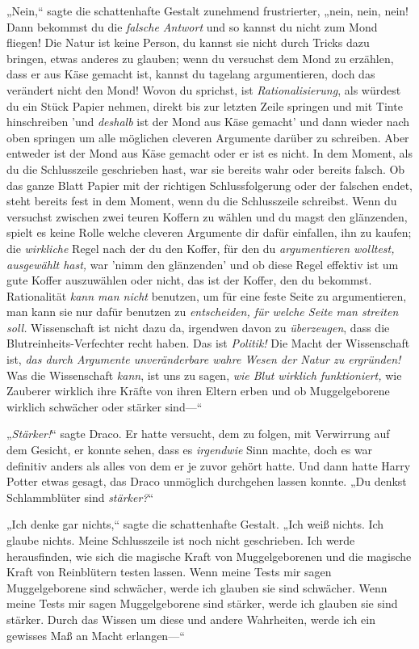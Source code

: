 {„Nein,“ sagte die schattenhafte Gestalt zunehmend frustrierter, „nein, nein, nein! Dann bekommst du die \emph{falsche Antwort} und so kannst du nicht zum Mond fliegen! Die Natur ist keine Person, du kannst sie nicht durch Tricks dazu bringen, etwas anderes zu glauben; wenn du versuchst dem Mond zu erzählen, dass er aus Käse gemacht ist, kannst du tagelang argumentieren, doch das verändert nicht den Mond! Wovon du sprichst, ist \emph{Rationalisierung}, als würdest du ein Stück Papier nehmen, direkt bis zur letzten Zeile springen und mit Tinte hinschreiben 'und \emph{deshalb} ist der Mond aus Käse gemacht' und dann wieder nach oben springen um alle möglichen cleveren Argumente darüber zu schreiben. Aber entweder ist der Mond aus Käse gemacht oder er ist es nicht. In dem Moment, als du die Schlusszeile geschrieben hast, war sie bereits wahr oder bereits falsch. Ob das ganze Blatt Papier mit der richtigen Schlussfolgerung oder der falschen endet, steht bereits fest in dem Moment, wenn du die Schlusszeile schreibst. Wenn du versuchst zwischen zwei teuren Koffern zu wählen und du magst den glänzenden, spielt es keine Rolle welche cleveren Argumente dir dafür einfallen, ihn zu kaufen; die \emph{wirkliche} Regel nach der du den Koffer, für den du \emph{argumentieren wolltest, ausgewählt hast,} war 'nimm den glänzenden' und ob diese Regel effektiv ist um gute Koffer auszuwählen oder nicht, das ist der Koffer, den du bekommst. Rationalität \emph{kann man nicht} benutzen, um für eine feste Seite zu argumentieren, man kann sie nur dafür benutzen zu \emph{entscheiden, für welche Seite man streiten soll.} Wissenschaft ist nicht dazu da, irgendwen davon zu \emph{überzeugen}, dass die Blutreinheits-Verfechter recht haben. Das ist \emph{Politik!} Die Macht der Wissenschaft ist, \emph{das durch Argumente unveränderbare wahre Wesen der Natur zu ergründen!} Was die Wissenschaft \emph{kann}, ist uns zu sagen, \emph{wie Blut wirklich funktioniert,} wie Zauberer wirklich ihre Kräfte von ihren Eltern erben und ob Muggelgeborene wirklich schwächer oder stärker sind—“

„\emph{Stärker!}“ sagte Draco. Er hatte versucht, dem zu folgen, mit Verwirrung auf dem Gesicht, er konnte sehen, dass es \emph{irgendwie} Sinn machte, doch es war definitiv anders als alles von dem er je zuvor gehört hatte. Und dann hatte Harry Potter etwas gesagt, das Draco unmöglich durchgehen lassen konnte. „Du denkst Schlammblüter sind \emph{stärker?}“

„Ich denke gar nichts,“ sagte die schattenhafte Gestalt. „Ich weiß nichts. Ich glaube nichts. Meine Schlusszeile ist noch nicht geschrieben. Ich werde herausfinden, wie sich die magische Kraft von Muggelgeborenen und die magische Kraft von Reinblütern testen lassen. Wenn meine Tests mir sagen Muggelgeborene sind schwächer, werde ich glauben sie sind schwächer. Wenn meine Tests mir sagen Muggelgeborene sind stärker, werde ich glauben sie sind stärker. Durch das Wissen um diese und andere Wahrheiten, werde ich ein gewisses Maß an Macht erlangen—“

}
